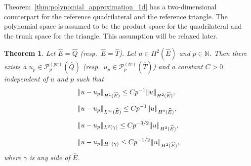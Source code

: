 \documentclass[english, 12pt, a4paper, sci, utf8, a-2b, online]{aaltothesis}
\theoremstyle{definition}
\theoremstyle{plain}
\newtheorem{theorem}{Theorem}[section]
\DeclarePairedDelimiter\norm{\lVert}{\rVert}
\numberwithin{equation}{section}
\begin{document}
Theorem~\ref{thm:polynomial_approximation_1d}
has a two-dimensional counterpart for the reference quadrilateral
and the reference triangle.
The polynomial space is assumed to be the product space for the quadrilateral
and the trunk space for the triangle. This assumption will be relaxed later.
\begin{theorem}
    \label{thm:polynomial_approximation_2d}
    Let $\widehat{E} = \widehat{Q}$ (resp.\ $\widehat{E} = \widehat{T}$).
    Let $u \in H^2(\widehat{E})$ and $p \in \mathbb{N}$.
    Then there exists a $u_p \in \mathcal{P}_p^{(pr)}(\widehat{Q})$
    (resp.\ $u_p \in \mathcal{P}_p^{(tr)}(\widehat{T})$) and
    a constant $C > 0$ independent of $u$ and $p$ such that
    \begin{align}
        \label{eq:polynomial_approximation_2d_res1}
        &\norm{u-u_p}_{H^1(\widehat{E})}
        \leq C p^{-1} \norm{u}_{H^2(\widehat{E})}, \\[0.5em]
        \label{eq:polynomial_approximation_2d_res2}
        &\norm{u-u_p}_{L^{\infty}(\widehat{E})}
        \leq C p^{-1} \norm{u}_{H^2(\widehat{E})}, \\[0.5em]
        \label{eq:polynomial_approximation_2d_res3}
        &\norm{u-u_p}_{L^2(\gamma)}
        \leq C p^{-3/2} \norm{u}_{H^2(\widehat{E})}, \\[0.5em]
        \label{eq:polynomial_approximation_2d_res4}
        &\norm{u-u_p}_{H^1(\gamma)}
        \leq C p^{-1/2} \norm{u}_{H^2(\widehat{E})},
    \end{align}
    where $\gamma$ is any side of $\widehat{E}$.
\end{theorem}
\end{document}
